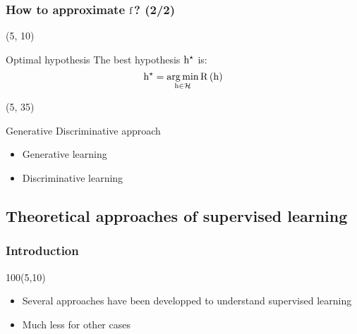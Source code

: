 \begin{frame}
  \frametitle{How to approximate $\mathrm{f}$? (2/2)}

  \begin{textblock}{90}(5, 10)
    \begin{block}{Optimal hypothesis}
      The best hypothesis $\mathrm{h}^{\star}$ is:
      \[
        \mathrm{h}^{\star} = \operatorname*{arg\,min}_{\mathrm{h} \in \mathcal{H}} \mathrm{R} \left ( {\mathrm{h}} \right )
      \]
    \end{block}
  \end{textblock}

  \begin{textblock}{90}(5, 35)
    \begin{block}{Generative \vs{} Discriminative approach}
      \begin{itemize}
      \item Generative learning
      \item Discriminative learning
      \end{itemize}
    \end{block}
  \end{textblock}
\end{frame}


\subsection{Theoretical approaches of supervised learning}

\begin{frame}
  \frametitle{Introduction}

  \begin{textblock}{100}(5,10)
    \begin{itemize}
    \item Several approaches have been developped to understand
      supervised learning
    \item Much less for other cases
    \end{itemize}
  \end{textblock}
\end{frame}



